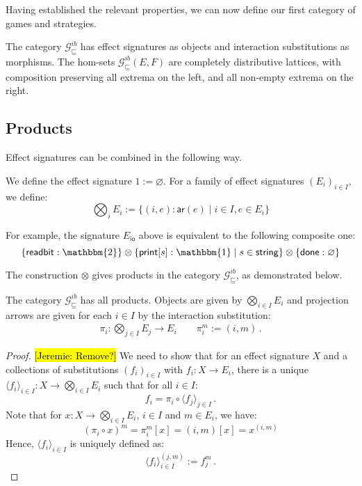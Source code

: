\documentclass[sigplan,screen]{acmart}
\newcommand{\gcat}{\mathcal{G}_{\sqsubseteq}}
\newcommand{\kw}[1]{\ensuremath{ \mathsf{#1} }}
\newcommand{\hlc}[2][yellow]{ {\sethlcolor{#1} \hl{#2}} }
\newcommand\jk[1]{\hlc[pink]{[Jeremie: #1]}}
\begin{document}
Having established the relevant properties,
we can now define our first category of games and strategies.

\begin{definition}
The category $\gcat^{ib}$ has effect signatures as objects
and interaction substitutions as morphisms.
The hom-sets $\gcat^{ib}(E, F)$
are completely distributive lattices,
with composition preserving all extrema on the left,
and all non-empty extrema on the right.
\end{definition}


\subsection{Products} %

Effect signatures can be combined in the following way.

\begin{definition}
We define the effect signature
$1 := \varnothing$.
For a family of effect signatures $(E_i)_{i \in I}$,
we define:
\[
  \bigotimes_i E_i := \{ (i, e) : \kw{ar}(e) \mid i \in I, e \in E_i \}
\]
\end{definition}

For example,
the signature $E_\kw{io}$ above is equivalent
to the following composite one:
\[
    \{ \kw{readbit} : \mathbbm{2} \} \otimes
    \{ \kw{print}[s] : \mathbbm{1} \mid s \in \kw{string} \} \otimes
    \{ \kw{done} : \varnothing \}
\]

The construction $\otimes$ gives products in the category $\gcat^{ib}$,
as demonstrated below.

\begin{theorem}
The category $\gcat^{ib}$ has all products.
Objects are given by $\bigotimes_{i \in I} E_i$
and projection arrows are
given for each $i \in I$ by
the interaction substitution:
\begin{gather*}
    \pi_i : \bigotimes_{j \in I} E_j \rightarrow E_i \qquad
    \pi_i^m := (i, m) \,.
\end{gather*}
\begin{proof}
\jk{Remove?}
We need to show that for an effect signature $X$
and a collections of substitutions $(f_i)_{i \in I}$ with
$f_i : X \rightarrow E_i$,
there is a unique
$\langle f_i \rangle_{i \in I} : X \rightarrow \bigotimes_{i \in I} E_i$
such that for all $i \in I$:
\[
    f_i = \pi_i \circ \langle f_j \rangle_{j \in I} \,.
\]
Note that for $x : X \rightarrow \bigotimes_{i \in I} E_i$,
$i \in I$ and $m \in E_i$, we have:
\[
    (\pi_i \circ x)^m = \pi_i^m[x] = (i, m) [x] = x^{(i, m)}
\]
Hence, $\langle f_i \rangle_{i \in I}$ is uniquely defined as:
\[
    \langle f_i \rangle_{i \in I}^{(j, m)} := f_j^m \,.
\]
\end{proof}
\end{theorem}
\end{document}
